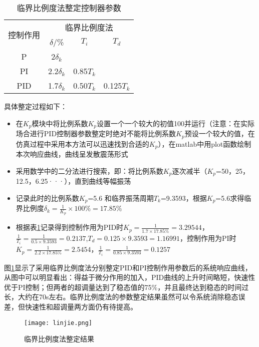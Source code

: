 \documentclass{WHUMaster}   %
\begin{document}
\begin{table}[htbp]
	\centering
	\caption{临界比例度法整定控制器参数}
	\begin{tabular}{cccccccc}
		\toprule
		\multicolumn{2}{c}{\multirow{2}[4]{*}{控制作用}} & \multicolumn{6}{c}{临界比例度法} \\
		\cmidrule{3-8}    \multicolumn{2}{c}{} & \multicolumn{2}{c}{$\delta$/\%} & \multicolumn{2}{c}{$T_i$} & \multicolumn{2}{c}{$T_d$} \\
		\midrule
		\multicolumn{2}{c}{P} & \multicolumn{2}{c}{2$\delta _k$} & \multicolumn{2}{c}{} & \multicolumn{2}{c}{} \\
		\midrule
		\multicolumn{2}{c}{PI} & \multicolumn{2}{c}{2.2$\delta _k$} & \multicolumn{2}{c}{0.85$T_k$} & \multicolumn{2}{c}{} \\
		\midrule
		\multicolumn{2}{c}{PID} & \multicolumn{2}{c}{1.7$\delta _k$} & \multicolumn{2}{c}{0.50$T_k$} & \multicolumn{2}{c}{0.125$T_k$} \\
		\bottomrule
	\end{tabular}%
	\label{tab1}%
\end{table}%

具体整定过程如下：
\begin{itemize}
		\item 在$K_p$模块中将比例系数$K_p$设置一个一个较大的初值100并运行（注意：在实际场合进行PID控制器参数整定时绝对不能将比例系数$K_p$预设一个较大的值，在仿真过程中采用本方法可以迅速找到合适的$K_p$），在matlab中用plot函数绘制本次响应曲线，曲线呈发散震荡形式 
		\item 采用数学中的二分法进行搜索，即：将比例系数$K_p$逐次减半（$K_p$=50，25，12.5，6.25···），直到曲线等幅振荡
		\item 记录此时的比例系数$K_p$=5.6 和临界振荡周期$T_k$=9.3593，根据$K_p$=5.6求得临界比例度$\delta _k=\frac{1}{K_p}\times \text{100\%}=\text{17.85\%}$
		\item 根据表\ref{tab1}记录得到控制作用为PID时$K_p=\frac{1}{1.7\times \text{17.85\%}}=3.29544$，$\frac{1}{T_i}=\frac{1}{0.5\times 9.3593}=0.2137$,$T_d=0.125\times 9.3593=1.16991$，控制作用为PI时$K_p=\frac{1}{2.2\times \text{17.85\%}}=2.5454$，$\frac{1}{T_i}=\frac{1}{0.85\times 9.3593}=0.1257$
\end{itemize}
图\ref{fig3}显示了采用临界比例度法分别整定PID和PI控制作用参数后的系统响应曲线，从图中可以明显看出：得益于微分作用的加入，PID曲线的上升时间略短，快速性优于PI控制；但两者的超调量达到了稳态值的75\%，并且最终达到稳态的时间过长，大约在70s左右。临界比例度法的参数整定结果虽然可以令系统消除稳态误差，但快速性和超调量两方面仍有待提高。
\begin{figure}[h]
	\small
	\centering
	\texttt{[image: linjie.png]}
	\caption{临界比例度法整定结果} \label{fig3}
\end{figure}
\end{document}

